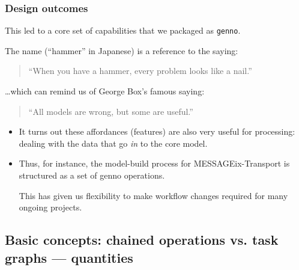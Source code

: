 \documentclass[12pt,aspectratio=169]{beamer}
\renewcommand{\mod}[1]{\texttt{#1}}
\begin{document}
\begin{frame}
\frametitle{Design outcomes}
This led to a core set of capabilities that we packaged as \mod{genno}.

The name (“hammer” in Japanese) is a reference to the saying:

\begin{quote}
  “When you have a hammer, every problem looks like a nail.”
\end{quote}

…which can remind us of George Box's famous saying:
\begin{quote}
  “All models are wrong, but some are useful.”
\end{quote}

\begin{itemize}
  \item It turns out these affordances (features) are also very useful
    for processing: dealing with the data that go \emph{in} to the core model.
  \item Thus, for instance, the model-build process for MESSAGEix-Transport
    is structured as a set of genno operations.

    This has given us flexibility to make workflow changes required for many ongoing projects.
\end{itemize}
\end{frame}

\subsection{Basic concepts: chained operations vs. task graphs — quantities}
\end{document}
